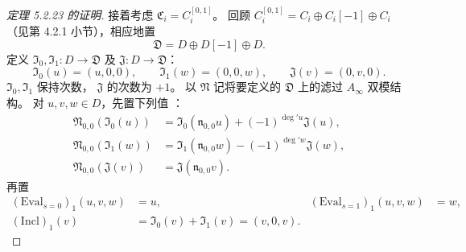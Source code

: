 \begin{proof}[定理 5.2.23 的证明]
接着考虑 $\mathfrak C_i=C_i^{[0,1]}$。
回顾
$C_i^{[0,1]}=C_i\oplus C_i[-1]\oplus C_i$
（见第 4.2.1 小节），相应地置
\[
\mathfrak D=D\oplus D[-1]\oplus D.
\]
定义 $\mathfrak I_0,\mathfrak I_1:D\to\mathfrak D$
及 $\mathfrak J:D\to\mathfrak D$：
\[
\mathfrak I_0(u)=(u,0,0),\qquad
\mathfrak I_1(w)=(0,0,w),\qquad
\mathfrak J(v)=(0,v,0).
\]
$\mathfrak I_0,\mathfrak I_1$ 保持次数，
$\mathfrak J$ 的次数为 $+1$。
以 $\mathfrak N$ 记将要定义的
$\mathfrak D$ 上的滤过 $A_\infty$ 双模结构。
对 $u,v,w\in D$，先置下列值
：
\begin{equation}
\begin{aligned}
\mathfrak N_{0,0}(\mathfrak I_0(u))
&=\mathfrak I_0(\mathfrak n_{0,0}u)
  +(-1)^{\deg' u}\mathfrak J(u),\\
\mathfrak N_{0,0}(\mathfrak I_1(w))
&=\mathfrak I_1(\mathfrak n_{0,0}w)
  -(-1)^{\deg' w}\mathfrak J(w),\\
\mathfrak N_{0,0}(\mathfrak J(v))
&=\mathfrak J(\mathfrak n_{0,0}v).
\end{aligned}
\tag{5.2.25}\label{eq:5-2-25}
\end{equation}
再置
\begin{equation}
\begin{aligned}
(\mathrm{Eval}_{s=0})_1(u,v,w)&=u,
&(\mathrm{Eval}_{s=1})_1(u,v,w)&=w,\\
(\mathrm{Incl})_1(v)
&=\mathfrak I_0(v)+\mathfrak I_1(v)
=(v,0,v).
\end{aligned}
\tag{5.2.26}\label{eq:5-2-26}
\end{equation}


\end{proof}
